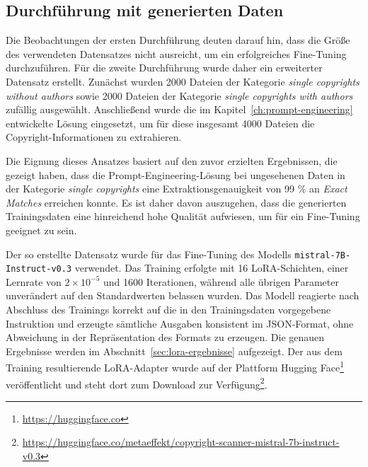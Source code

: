 \subsection{Durchführung mit generierten Daten}

Die Beobachtungen der ersten Durchführung deuten darauf hin, dass die Größe des verwendeten Datensatzes nicht ausreicht, um ein erfolgreiches Fine-Tuning durchzuführen.
Für die zweite Durchführung wurde daher ein erweiterter Datensatz erstellt.
Zunächst wurden \num{2000} Dateien der Kategorie \textit{single copyrights without authors} sowie \num{2000} Dateien der Kategorie \textit{single copyrights with authors} zufällig ausgewählt.
Anschließend wurde die im Kapitel~\ref{ch:prompt-engineering} entwickelte Lösung eingesetzt, um für diese insgesamt \num{4000} Dateien die Copyright-Informationen zu extrahieren.

Die Eignung dieses Ansatzes basiert auf den zuvor erzielten Ergebnissen, die gezeigt haben, dass die Prompt-Engineering-Lösung bei ungesehenen Daten in der Kategorie \textit{single copyrights} eine Extraktionsgenauigkeit von \num{99} \% an \textit{Exact Matches} erreichen konnte.
Es ist daher davon auszugehen, dass die generierten Trainingsdaten eine hinreichend hohe Qualität aufwiesen, um für ein Fine-Tuning geeignet zu sein.

Der so erstellte Datensatz wurde für das Fine-Tuning des Modells \texttt{mistral-7B-Instruct-v0.3} verwendet.
Das Training erfolgte mit 16 LoRA-Schichten, einer Lernrate von $2 \times 10^{-5}$ und \num{1600} Iterationen, während alle übrigen Parameter unverändert auf den Standardwerten belassen wurden.
Das Modell reagierte nach Abschluss des Trainings korrekt auf die in den Trainingsdaten vorgegebene Instruktion und erzeugte sämtliche Ausgaben konsistent im JSON-Format, ohne Abweichung in der Repräsentation des Formats zu erzeugen.
Die genauen Ergebnisse werden im Abschnitt~\ref{sec:lora-ergebnisse} aufgezeigt.
Der aus dem Training resultierende LoRA-Adapter wurde auf der Plattform Hugging Face\footnote{\url{https://huggingface.co}} veröffentlicht und steht dort zum Download zur Verfügung\footnote{\url{https://huggingface.co/metaeffekt/copyright-scanner-mistral-7b-instruct-v0.3}}.

